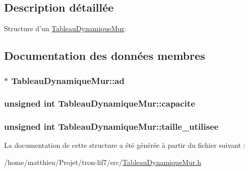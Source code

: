 \subsection{Description détaillée}
Structure d'un \hyperlink{structTableauDynamiqueMur}{Tableau\-Dynamique\-Mur}. 

\subsection{Documentation des données membres}
\hypertarget{structTableauDynamiqueMur_a922754666b4214fea4cb56fdacddc2e4}{
\subsubsection[{ad}]{$\ast$ Tableau\-Dynamique\-Mur\-::ad}}\label{structTableauDynamiqueMur_a922754666b4214fea4cb56fdacddc2e4}
\hypertarget{structTableauDynamiqueMur_a3ac67653487ce5f4ae8e1c2626469f45}{
\subsubsection[{capacite}]{\setlength{\rightskip}{0pt plus 5cm}unsigned int Tableau\-Dynamique\-Mur\-::capacite}}\label{structTableauDynamiqueMur_a3ac67653487ce5f4ae8e1c2626469f45}
\hypertarget{structTableauDynamiqueMur_a10c3a4a33a8a9071a70788920a8459b5}{
\subsubsection[{taille\-\_\-utilisee}]{\setlength{\rightskip}{0pt plus 5cm}unsigned int Tableau\-Dynamique\-Mur\-::taille\-\_\-utilisee}}\label{structTableauDynamiqueMur_a10c3a4a33a8a9071a70788920a8459b5}


La documentation de cette structure a été générée à partir du fichier suivant \-:\begin{DoxyCompactItemize}
\item 
/home/matthieu/\-Projet/tron-\/lif7/src/\hyperlink{TableauDynamiqueMur_8h}{Tableau\-Dynamique\-Mur.\-h}\end{DoxyCompactItemize}
